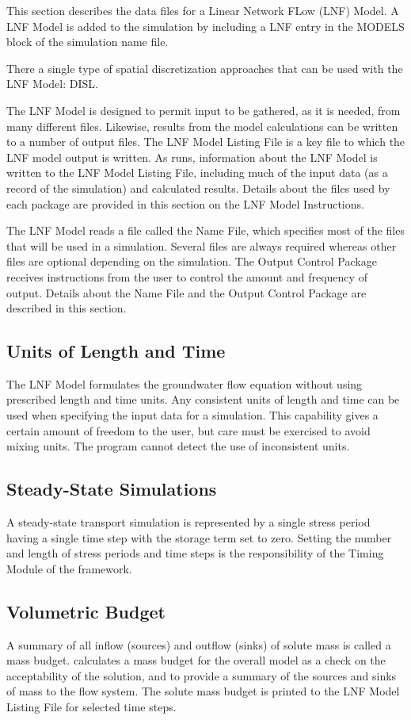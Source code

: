 This section describes the data files for a \mf Linear Network FLow (LNF) Model.  A LNF Model is added to the simulation by including a LNF entry in the MODELS block of the simulation name file.

There a single type of spatial discretization approaches that can be used with the LNF Model: DISL.

The LNF Model is designed to permit input to be gathered, as it is needed, from many different files.  Likewise, results from the model calculations can be written to a number of output files. The LNF Model Listing File is a key file to which the LNF model output is written.  As \mf runs, information about the LNF Model is written to the LNF Model Listing File, including much of the input data (as a record of the simulation) and calculated results.  Details about the files used by each package are provided in this section on the LNF Model Instructions.

The LNF Model reads a file called the Name File, which specifies most of the files that will be used in a simulation. Several files are always required whereas other files are optional depending on the simulation. The Output Control Package receives instructions from the user to control the amount and frequency of output.  Details about the Name File and the Output Control Package are described in this section.


\subsection{Units of Length and Time}
The LNF Model formulates the groundwater flow equation without using prescribed length and time units. Any consistent units of length and time can be used when specifying the input data for a simulation. This capability gives a certain amount of freedom to the user, but care must be exercised to avoid mixing units.  The program cannot detect the use of inconsistent units.

\subsection{Steady-State Simulations}
A steady-state transport simulation is represented by a single stress period having a single time step with the storage term set to zero. Setting the number and length of stress periods and time steps is the responsibility of the Timing Module of the \mf framework.

\subsection{Volumetric Budget}
A summary of all inflow (sources) and outflow (sinks) of solute mass is called a mass budget.  \mf calculates a mass budget for the overall model as a check on the acceptability of the solution, and to provide a summary of the sources and sinks of mass to the flow system.  The solute mass budget is printed to the LNF Model Listing File for selected time steps.

